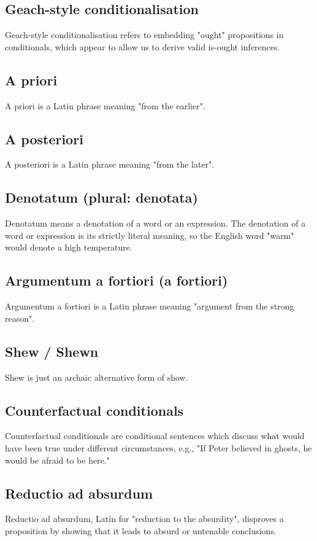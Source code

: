 \documentclass[11pt]{article}
\begin{document}
\subsection{Geach-style conditionalisation}
\label{sec:org3686be5}
Geach-style conditionalisation refers to embedding "ought" propositions in conditionals, which appear to allow us to derive valid is-ought inferences.
\subsection{A priori}
\label{sec:orgd4239ba}
A priori is a Latin phrase meaning "from the earlier".
\subsection{A posteriori}
\label{sec:org469ee69}
A posteriori is a Latin phrase meaning "from the later".
\subsection{Denotatum (plural: denotata)}
\label{sec:orgb839de4}
Denotatum means a denotation of a word or an expression. The denotation of a word or expression is its strictly literal meaning, so the English word "warm" would denote a high temperature.
\subsection{Argumentum a fortiori (a fortiori)}
\label{sec:org66c2e95}
Argumentum a fortiori is a Latin phrase meaning "argument from the strong reason".
\subsection{Shew / Shewn}
\label{sec:orgaab74cc}
Shew is just an archaic alternative form of show.
\subsection{Counterfactual conditionals}
\label{sec:orgebf3b65}
Counterfactual conditionals are conditional sentences which discuss what would have been true under different circumstances, e.g., "If Peter believed in ghosts, he would be afraid to be here."
\subsection{Reductio ad absurdum}
\label{sec:orgb417c5b}
Reductio ad absurdum, Latin for "reduction to the absurdity", disproves a proposition by showing that it leads to absurd or untenable conclusions.
\end{document}
